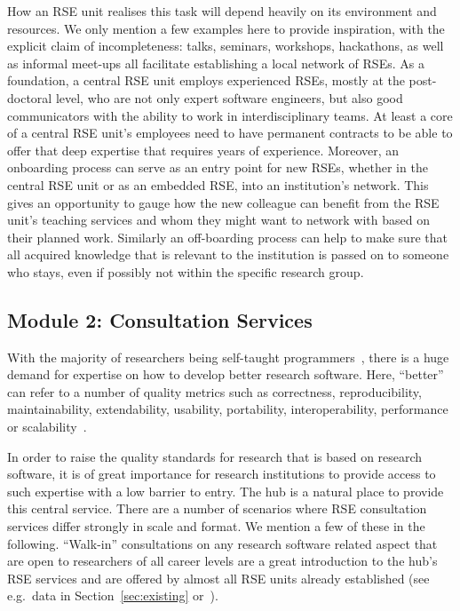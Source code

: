 \documentclass[a4paper]{article}
\begin{document}
How an RSE unit realises this task will depend heavily on its environment and resources.
We only mention a few examples here to provide inspiration, with the explicit claim of incompleteness:
talks, seminars, workshops, hackathons, as well as informal meet-ups all facilitate establishing a local network of RSEs.
As a foundation, a central RSE unit employs experienced RSEs, mostly at the post-doctoral level, who are not only expert software engineers, but also good communicators with the ability to work in interdisciplinary teams.
At least a core of a central RSE unit's employees need to have permanent contracts to be able to offer that deep expertise that requires years of experience.
Moreover, an onboarding process can serve as an entry point for new RSEs, whether in the central RSE unit or as an embedded RSE, into an institution's network.
This gives an opportunity to gauge how the new colleague can benefit from the RSE unit's teaching services and whom they might want to network with based on their planned work.
Similarly an off-boarding process can help to make sure that all acquired knowledge that is relevant to the institution is passed on to someone who stays, even if possibly not within the specific research group.

\subsection{Module 2: Consultation Services}%
\label{sec:consultation}

With the majority of researchers being self-taught programmers~\autocite{Carver2013}, there is a huge demand for expertise on how to develop better research software.
Here, “better” can refer to a number of quality metrics such as correctness, reproducibility, maintainability, extendability, usability, portability, interoperability, performance or scalability~\autocite[Chapter 16]{Schulmeyer2008}.

In order to raise the quality standards for research that is based on research software, it is of great importance for research institutions to provide access to such expertise with a low barrier to entry.
The hub is a natural place to provide this central service.
There are a number of scenarios where RSE consultation services differ strongly in scale and format.
We mention a few of these in the following.
“Walk-in” consultations on any research software related aspect that are open to researchers of all career levels are a great introduction to the hub's RSE services and are offered by almost all RSE units already established (see e.g.\ data in Section~\ref{sec:existing} or~\cite{Katz2019}).
\end{document}
